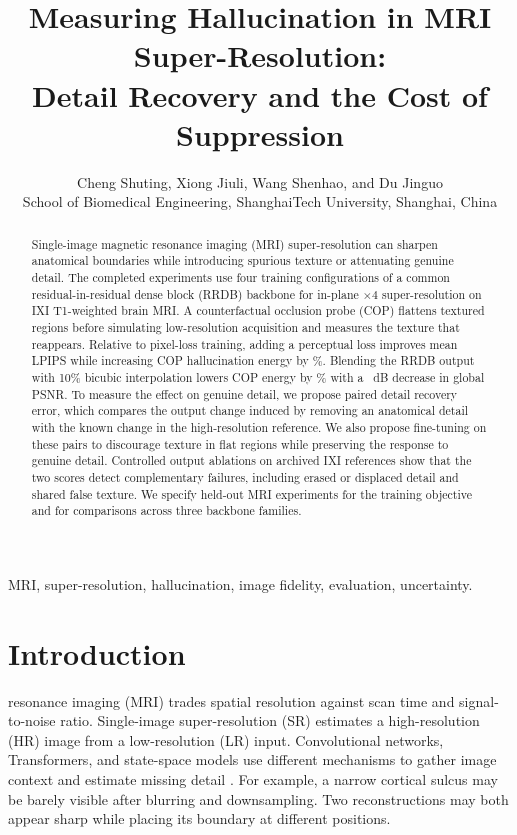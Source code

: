 \documentclass[journal]{IEEEtran}
\begin{document}
\title{Measuring Hallucination in MRI Super-Resolution:\\ Detail Recovery and the Cost of Suppression}

\author{Cheng Shuting, Xiong Jiuli, Wang Shenhao, and Du Jinguo\\
School of Biomedical Engineering, ShanghaiTech University, Shanghai, China}

\maketitle

\begin{abstract}
Single-image magnetic resonance imaging (MRI) super-resolution can sharpen anatomical boundaries while introducing spurious texture or attenuating genuine detail. The completed experiments use four training configurations of a common residual-in-residual dense block (RRDB) backbone for in-plane $\times4$ super-resolution on IXI T1-weighted brain MRI. A counterfactual occlusion probe (COP) flattens textured regions before simulating low-resolution acquisition and measures the texture that reappears. Relative to pixel-loss training, adding a perceptual loss improves mean LPIPS while increasing COP hallucination energy by \HEpercPct{}\%. Blending the RRDB output with 10\% bicubic interpolation lowers COP energy by \HEshrinkPct{}\% with a \PSNRshrink{}~dB decrease in global PSNR. To measure the effect on genuine detail, we propose paired detail recovery error, which compares the output change induced by removing an anatomical detail with the known change in the high-resolution reference. We also propose fine-tuning on these pairs to discourage texture in flat regions while preserving the response to genuine detail. Controlled output ablations on archived IXI references show that the two scores detect complementary failures, including erased or displaced detail and shared false texture. We specify held-out MRI experiments for the training objective and for comparisons across three backbone families.
\end{abstract}

\begin{IEEEkeywords}
MRI, super-resolution, hallucination, image fidelity, evaluation, uncertainty.
\end{IEEEkeywords}

\section{Introduction}
 resonance imaging (MRI) trades spatial resolution against scan time and signal-to-noise ratio. Single-image super-resolution (SR) estimates a high-resolution (HR) image from a low-resolution (LR) input. Convolutional networks, Transformers, and state-space models use different mechanisms to gather image context and estimate missing detail \cite{dong2016srcnn,chen2023hat,guo2025mambairv2}. For example, a narrow cortical sulcus may be barely visible after blurring and downsampling. Two reconstructions may both appear sharp while placing its boundary at different positions.
\end{document}
